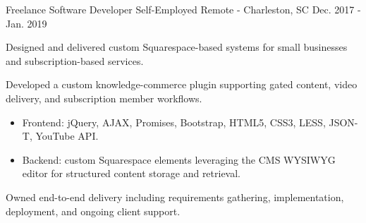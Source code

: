 \begin{cventries}
  \cventry
    {Freelance Software Developer} %
    {Self-Employed} %
    {Remote - Charleston, SC} %
    {Dec. 2017 - Jan. 2019} %
    {
      \begin{cvitems}
        \item {Designed and delivered custom Squarespace-based systems for small businesses and subscription-based services.}
        \item {Developed a custom knowledge-commerce plugin supporting gated content, video delivery, and subscription member workflows.}
        \begin{itemize}[leftmargin=2.5ex, itemsep=.8mm]
          \vspace{0.8mm}
          \item {Frontend: jQuery, AJAX, Promises, Bootstrap, HTML5, CSS3, LESS, JSON-T, YouTube API.}
          \vspace{0.3mm}
          \item {Backend: custom Squarespace elements leveraging the CMS WYSIWYG editor for structured content storage and retrieval.}
        \end{itemize}
        \item {Owned end-to-end delivery including requirements gathering, implementation, deployment, and ongoing client support.}
      \end{cvitems}
    }



\end{cventries}
